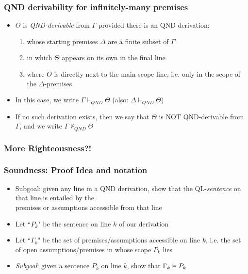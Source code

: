 \begin{frame}
\frametitle{QND derivability for infinitely-many premises}

\begin{itemize}

\item $\Theta$ is \emph{QND-derivable} from $\Gamma$ provided there is an QND derivation:

\begin{enumerate}[1.)]

\item whose starting premises $\Delta$ are a finite subset of $\Gamma$ 

\item in which $\Theta$ appears on its own in the final line

\item where $\Theta$ is directly next to the main scope line, i.e. only in the scope of the $\Delta$-premises

\end{enumerate}

\item In this case, we write $\Gamma \vdash_{QND} \Theta$ (also: $\Delta \vdash_{QND} \Theta$)

\item If no such derivation exists, then we say that $\Theta$ is NOT QND-derivable from $\Gamma$, and we write $\Gamma \nvdash_{QND} \Theta$

\end{itemize}
\end{frame}

\subsubsection{More Righteousness?!}

\begin{frame}
\frametitle{Soundness: Proof Idea and notation}

\begin{itemize}[<+->]

\item Subgoal: given any line in a QND derivation, show that the QL-\textit{sentence} on that line is entailed by the \\ premises or assumptions accessible from that line


\item Let ``\emph{$P_k$}" be the sentence on line $k$ of our derivation%

\item Let ``\emph{$\Gamma_k$}" be the set of premises/assumptions accessible on line $k$, i.e. the set of open assumptions/premises in whose scope $P_k$ lies

\item \emph{Subgoal}: given a sentence $P_k$ on line $k$, show that $\Gamma_k \vDash P_k$


\end{itemize}
\end{frame}

